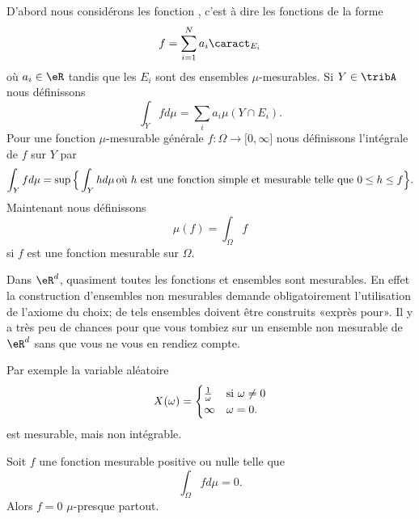D'abord nous considérons les fonction , c'est à dire les fonctions de la forme
\begin{equation}
    f=\sum_{i=1}^Na_i\caract_{E_i}
\end{equation}
où \( a_i\in\eR\) tandis que les \( E_i\) sont des ensembles \( \mu\)-mesurables. Si \( Y\in \tribA\) nous définissons
\begin{equation}
    \int_Yfd\mu=\sum_ia_i\mu(Y\cap E_i).
\end{equation}
Pour une fonction \( \mu\)-mesurable générale \( f\colon \Omega\to \mathopen[ 0 , \infty \mathclose]\) nous définissons l'intégrale de \( f\) sur \( Y\) par
\begin{equation}        \label{EqDefintYfdmu}
    \int_Yfd\mu=\sup\Big\{ \int_Yhd\mu\,\text{où \( h\) est une fonction simple et mesurable telle que \( 0\leq h\leq f\)} \Big\}.
\end{equation}
Maintenant nous définissons
\begin{equation}
    \mu(f)=\int_{\Omega}f
\end{equation}
si \( f\) est une fonction mesurable sur \( \Omega\).

\begin{remark}
    Dans \( \eR^d\), quasiment toutes les fonctions et ensembles sont mesurables. En effet la construction d'ensembles non mesurables demande obligatoirement l'utilisation de l'axiome du choix; de tels ensembles doivent être construits «exprès pour». Il y a très peu de chances pour que vous tombiez sur un ensemble non mesurable de \( \eR^d\) sans que vous ne vous en rendiez compte.

    Par exemple la variable aléatoire 
    \begin{equation}
        X(\omega)=\begin{cases}
            \frac{1}{ \omega }    &   \text{si $ \omega\neq 0$}\\
            \infty    &    \text{$\omega=0$}.
        \end{cases}
    \end{equation}
    est mesurable, mais non intégrable.
\end{remark}

\begin{lemma}   \label{Lemfobnwt}
    Soit \( f\) une fonction mesurable positive ou nulle telle que
    \begin{equation}
        \int_{\Omega}fd\mu=0.
    \end{equation}
    Alors \( f=0\) \( \mu\)-presque partout.
\end{lemma}

